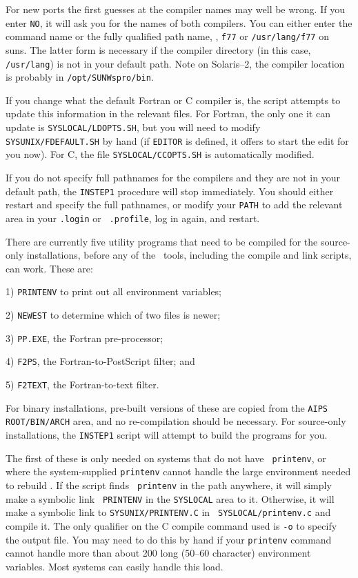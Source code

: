 For new ports the first guesses at the compiler names may well be wrong.
If you enter {\tt NO}, it will ask you for the names of both compilers.
You can either enter the command name or the fully qualified path name,
\eg, {\tt f77} or {\tt /usr/lang/f77} on suns.  The latter form is
necessary if the compiler directory (in this case, {\tt /usr/lang}) is
not in your default path.  Note on Solaris--2, the compiler location is
probably in {\tt /opt/SUNWspro/bin}.

If you change what the default Fortran or C compiler is, the script
attempts to update this information in the relevant files.  For Fortran,
the only one it can update is {\tt \dol SYSLOCAL/LDOPTS.SH}, but you will
need to modify {\tt \dol SYSUNIX/FDEFAULT.SH} by hand (if {\tt\dol EDITOR}
is defined, it offers to start the edit for you now).  For C, the file
{\tt\dol SYSLOCAL/CCOPTS.SH} is automatically modified.

If you do not specify full pathnames for the compilers and they are not
in your default path, the {\tt INSTEP1} procedure will stop immediately.
You should either restart and specify the full pathnames, or modify your
{\tt PATH} to add the relevant area in your {\tt .login} or {\tt
.profile}, log in again, and restart.

There are currently five
utility programs that need to be compiled for the source-only
installations, before any of the \AIPS\ tools, including the compile and
link scripts, can work.  These are: \medskip

\item{1)} {\tt PRINTENV} to print out all environment variables;
\item{2)} {\tt NEWEST} to determine which of two files is newer;
\item{3)} {\tt PP.EXE}, the Fortran pre-processor;
\item{4)} {\tt F2PS}, the Fortran-to-PostScript filter; and
\item{5)} {\tt F2TEXT}, the Fortran-to-text filter.
\medskip

\noindent For binary installations, pre-built versions of these are copied
from the {\tt \dol AIPS ROOT/BIN/\dol ARCH} area, and no
re-compilation should be necessary.  For source-only installations, the
{\tt INSTEP1} script will attempt to build the programs for you.

The first of these is only needed on systems that do not have {\tt
printenv}, or where the system-supplied {\tt printenv} cannot handle the
large environment needed to rebuild \AIPS.  If the script finds {\tt
printenv} in the path anywhere, it will simply make a symbolic link {\tt
PRINTENV} in the {\tt\dol SYSLOCAL} area to it.  Otherwise, it will make a
symbolic link to {\tt\dol SYSUNIX/PRINTENV.C} in {\tt\dol
SYSLOCAL/printenv.c} and compile it.  The only qualifier on the C compile
command used is {\tt -o} to specify the output file.  You may need to do
this by hand if your {\tt printenv} command cannot handle more than about
200 long (50--60 character) environment variables.  Most systems can
easily handle this load.

